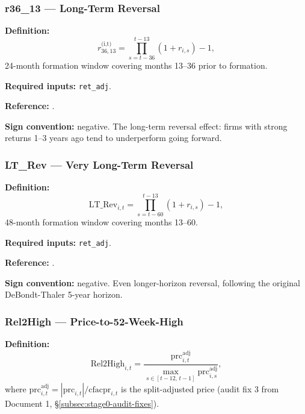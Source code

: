 \subsubsection{r36\_13 --- Long-Term Reversal}

\textbf{Definition:}
\begin{equation}
r_{36,13}^{\text{(i,t)}} = \prod_{s=t-36}^{t-13} (1 + r_{i,s}) - 1,
\label{eq:r36-13}
\end{equation}
24-month formation window covering months 13--36 prior to formation.

\textbf{Required inputs:} \texttt{ret\_adj}.

\textbf{Reference:} \cite{DeBondtThaler1985}.

\textbf{Sign convention:} negative. The long-term reversal effect:
firms with strong returns 1--3 years ago tend to underperform going
forward.

\subsubsection{LT\_Rev --- Very Long-Term Reversal}

\textbf{Definition:}
\begin{equation}
\mathrm{LT\_Rev}_{i,t} = \prod_{s=t-60}^{t-13} (1 + r_{i,s}) - 1,
\label{eq:lt-rev}
\end{equation}
48-month formation window covering months 13--60.

\textbf{Required inputs:} \texttt{ret\_adj}.

\textbf{Reference:} \cite{DeBondtThaler1985}.

\textbf{Sign convention:} negative. Even longer-horizon reversal,
following the original DeBondt-Thaler 5-year horizon.

\subsubsection{Rel2High --- Price-to-52-Week-High}

\textbf{Definition:}
\begin{equation}
\mathrm{Rel2High}_{i,t} = \frac{\mathrm{prc}^{\mathrm{adj}}_{i,t}}
                                {\max_{s \in [t-12,\, t-1]}
                                 \mathrm{prc}^{\mathrm{adj}}_{i,s}},
\label{eq:rel2high}
\end{equation}
where $\mathrm{prc}^{\mathrm{adj}}_{i,t} = |\mathrm{prc}_{i,t}|
/ \mathrm{cfacpr}_{i,t}$ is the split-adjusted price (audit fix 3 from
Document 1, \S\ref{subsec:stage0-audit-fixes}).

